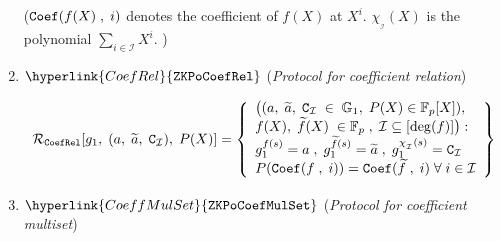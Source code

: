\documentclass[11pt, lettersize, notitlepage, leqno, footskip=0.6cm]{article}
\newcommand{\bFp}{\mathbb{F}_p}
\newcommand{\wti}{\widetilde}
\newcommand{\mc}{\mathcal}
\newcommand{\mb}{\mathbb}
\newcommand{\sub}{\subseteq}
\newcommand{\noin}{\noindent}
\numberwithin{equation}{section}
\begin{document}
\begin{enumerate}[wide, labelwidth=!, labelindent=0pt, itemsep=-0.2ex]
\noin (${\tt{Coef}}(f(X)\;,\; i)$ denotes the coefficient of $f(X)$ at $X^i$. $\chi_{_\mc{I}}(X)$ is the polynomial $\sum\limits_{i\in \mc{I}} X^i$. )




\begin{comment} \item $\hyperlink{AllNZCoef}{\tt{ZKPoAllNZCoef}}$ (\textit{Protocol for the set of all non-zero coefficients}) \vspace{-3mm}



$$\mc{R}_{\tt{AllNZCoef}}[g_1,\;(a,\;\;\wti{a}_{\tt{nz}})] = \left\{\begin{array}{l} \big((a,\;  \wti{a}_{\tt{nz}}\;\in\;\mb{G}_1),\\
f(X)\in \bFp\;,\; \mc{I} \sub [\deg(f)]\big): \\
g_1^{f(s)} = a\;,\;g_1^{\chi_{_\mc{I}}(s)} = \wti{a}_{\tt{nz}} \\
{\tt{Coef}}(f(X)\;,\; i)\neq 0 \;\forall\; i\in \mc{I}\\
{\tt{Coef}}(f(X)\;,\; i) = 0 \;\forall\; i\notin \mc{I}
\end{array}\right\}  $$ \end{comment}




\item $\hyperlink{CoefRel}{\tt{ZKPoCoefRel}}$ (\textit{Protocol for coefficient relation}) \vspace{-3mm}


$$\mc{R}_{\tt{CoefRel}}[g_1,\;(a,\;\wti{a},\; {\tt{C}}_{\mc{I}} ),\; P(X)] = \left\{\begin{array}{l} \big((a,\;  \wti{a},\;{\tt{C}}_{\mc{I}}\;\in\;\mb{G}_1,\; P(X)\in \bFp[X]),\\
f(X),\;\wti{f}(X)\;\in \bFp\;,\; \mc{I} \sub [\deg(f)]\big): \\
g_1^{f(s)} = a\;,\;g_1^{\wti{f}(s)} = \wti{a}\;,\;g_1^{\chi_{_{\mc{I}}}(s)} = \tt{C}_{\mc{I}} \\ \vspace{0.5mm}
P({\tt{Coef}}(f\;,\; i)) = {\tt{Coef}}(\wti{f}\;,\; i) \;\forall\; i\in \mc{I}\\

\end{array}\right\}  $$

\item $\hyperlink{CoeffMulSet}{\tt{ZKPoCoefMulSet}}$ (\textit{Protocol for coefficient multiset}) \vspace{-3mm}



\end{enumerate}
\end{document}
